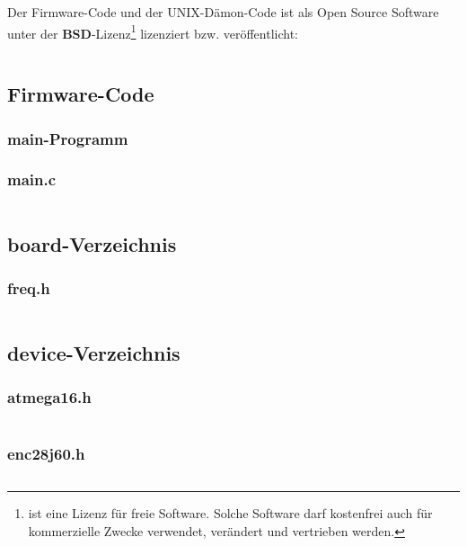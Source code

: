 \newpage

\begin{landscape}
Der Firmware-Code und der UNIX-Dämon-Code ist als Open Source Software unter der \textbf{BSD}-Lizenz\footnote{ist eine Lizenz für freie Software. Solche Software darf kostenfrei auch für kommerzielle Zwecke verwendet, verändert und vertrieben werden.} lizenziert bzw. veröffentlicht: \\

\inputminted{text}{./code/LICENSE}
%
\end{landscape}

\newpage

\begin{landscape}
	\begin{multicols}{2}
		\section{Firmware-Code}
		\subsubsection*{main-Programm}
		\subsubsection*{main.c}
		\inputminted[fontsize=\scriptsize,linenos,tabsize=4]{c}{./code/firmware/main.c}

		\subsection*{board-Verzeichnis}
		\subsubsection*{freq.h}
		\inputminted[fontsize=\scriptsize,linenos,tabsize=4]{c}{./code/firmware/board/freq.h}

		\subsection*{device-Verzeichnis}
		\subsubsection*{atmega16.h}
		\inputminted[fontsize=\scriptsize,linenos,tabsize=4]{c}{./code/firmware/device/atmega16.h}

		\subsubsection*{enc28j60.h}
		\inputminted[fontsize=\scriptsize,linenos,tabsize=4]{c}{./code/firmware/device/enc28j60.h}


\end{multicols}
\end{landscape}
